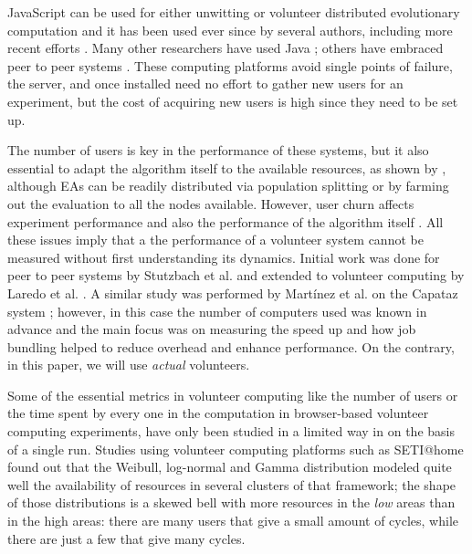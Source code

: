 \documentclass[letterpaper]{article}
\begin{document}
JavaScript can be used for either unwitting
\citep{unwitting-ec,boldrin2007distributed} or volunteer
\citep{langdon:2005:metas,gecco07:workshop:dcor} distributed
evolutionary computation and it has been used ever since by several
authors, including more recent efforts
\citep{Desell:2008:AHG:1389095.1389273,duda2013distributed,DBLP:journals/corr/abs-0801-1210}. Many
other researchers have used Java \citep{chong:1999:jDGPi}; others have
embraced peer to peer systems
\citep{jin2006constructing,10.1109/ICICSE.2008.99,DBLP:conf/3pgcic/GuervosMFEL12}. These
computing platforms avoid single points of failure, the server, and
once installed need no effort to gather new users for an experiment,
but the cost of acquiring new users is high since they need to be set
up.

The number of users is key in the performance of these systems, but it
also essential to adapt
the algorithm itself to the available resources, as shown by
\citep{milani2004online}, although EAs can be readily distributed via
population splitting or by farming out the evaluation to all 
the nodes available. However, user churn affects experiment performance 
\citep{gonzalez2010characterizing,nogueras2015studying} and also the
performance of the algorithm itself
\citep{DBLP:journals/gpem/LaredoBGVAGF14}. All these issues imply that
a the performance of a volunteer system cannot be
measured without first understanding its dynamics. Initial
work was done for peer to peer systems by Stutzbach et
al. \citep{stutzbach2006understanding} and extended to volunteer
computing by Laredo et al. \citep{churn08,laredo2008rcp}. A similar
study was performed by Martínez et al. on the Capataz system
\citep{martinez2015capataz}; however, in this case the number of
computers used was known in advance and the main focus was on
measuring the speed up and how job bundling helped to reduce overhead and
enhance performance. On the contrary, in this paper, we will use {\em
 actual} volunteers.

Some of the essential metrics in volunteer computing like the
number of users or the time spent by every one in the
computation in browser-based volunteer computing experiments, have
only been studied in a limited way in 
\citep{DBLP:journals/gpem/LaredoBGVAGF14} on the basis of a single
run. Studies using volunteer computing platforms such as SETI@home
\citep{javadi2009mining,agajaj} found out that the Weibull, log-normal and
Gamma distribution 
modeled quite well the availability of resources in several clusters
of that framework; the shape of those distributions is a skewed bell
with more resources in the {\em low} areas than in the high areas:
there are many users that give a small amount of cycles, while there
are just a few that give many cycles. 
\end{document}
